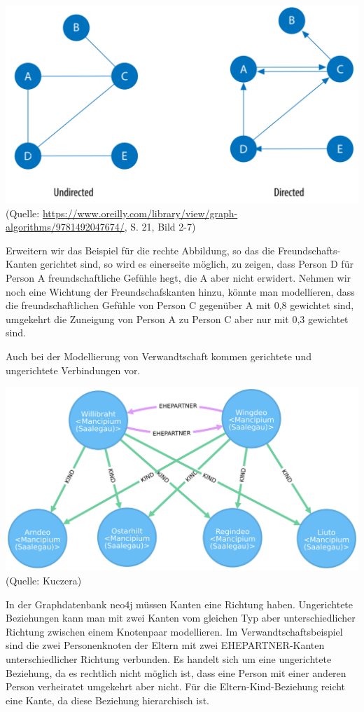 \documentclass[ngerman,]{scrreprt}
\begin{document}
\includegraphics{Bilder/Graph-Algorithms/21-2-7-UnDirected.png} (Quelle: \href{Needham/Hodler\%202019}{https://www.oreilly.com/library/view/graph-algorithms/9781492047674/}, S. 21, Bild 2-7)

Erweitern wir das Beispiel für die rechte Abbildung, so das die Freundschafts-Kanten gerichtet sind, so wird es einerseite möglich, zu zeigen, dass Person D für Person A freundschaftliche Gefühle hegt, die A aber nicht erwidert. Nehmen wir noch eine Wichtung der Freundschafskanten hinzu, könnte man modellieren, dass die freundschaftlichen Gefühle von Person C gegenüber A mit 0,8 gewichtet sind, umgekehrt die Zuneigung von Person A zu Person C aber nur mit 0,3 gewichtet sind.

Auch bei der Modellierung von Verwandtschaft kommen gerichtete und ungerichtete Verbindungen vor.

\includegraphics{Bilder/NomenEtGensBeispiel1.png} (Quelle: Kuczera)

In der Graphdatenbank neo4j müssen Kanten eine Richtung haben. Ungerichtete Beziehungen kann man mit zwei Kanten vom gleichen Typ aber unterschiedlicher Richtung zwischen einem Knotenpaar modellieren. Im Verwandtschaftsbeispiel sind die zwei Personenknoten der Eltern mit zwei EHEPARTNER-Kanten unterschiedlicher Richtung verbunden. Es handelt sich um eine ungerichtete Beziehung, da es rechtlich nicht möglich ist, dass eine Person mit einer anderen Person verheiratet umgekehrt aber nicht. Für die Eltern-Kind-Beziehung reicht eine Kante, da diese Beziehung hierarchisch ist.
\end{document}
